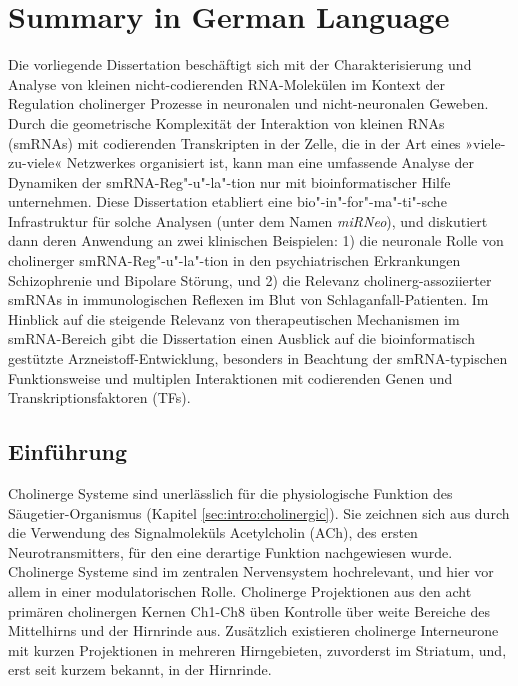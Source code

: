 \section{Summary in German Language}
Die vorliegende Dissertation beschäftigt sich mit der Charakterisierung und Analyse von kleinen nicht-codierenden RNA-Molekülen im Kontext der Regulation cholinerger Prozesse in neuronalen und nicht-neuronalen Geweben. Durch die geometrische Komplexität der Interaktion von kleinen RNAs (smRNAs) mit codierenden Transkripten in der Zelle, die in der Art eines »viele-zu-viele« Netzwerkes organisiert ist, kann man eine umfassende Analyse der Dynamiken der smRNA-Reg"-u"-la"-tion nur mit bioinformatischer Hilfe unternehmen. Diese Dissertation etabliert eine bio"-in"-for"-ma"-ti"-sche Infrastruktur für solche Analysen (unter dem Namen \emph{miRNeo}), und diskutiert dann deren Anwendung an zwei klinischen Beispielen: 1) die neuronale Rolle von cholinerger smRNA-Reg"-u"-la"-tion in den psychiatrischen Erkrankungen Schizophrenie und Bipolare Störung,\cite{Lobentanzer2019a} und 2) die Relevanz cholinerg-assoziierter smRNAs in immunologischen Reflexen im Blut von Schlaganfall-Patienten.\cite{Winek2020} Im Hinblick auf die steigende Relevanz von therapeutischen Mechanismen im smRNA-Bereich gibt die Dissertation einen Ausblick auf die bioinformatisch gestützte Arzneistoff-Entwicklung, besonders in Beachtung der smRNA-typischen Funktionsweise und multiplen Interaktionen mit codierenden Genen und Transkriptionsfaktoren (TFs).

\subsection{Einführung}
Cholinerge Systeme sind unerlässlich für die physiologische Funktion des Säugetier-Organismus (Kapitel \ref{sec:intro:cholinergic}). Sie zeichnen sich aus durch die Verwendung des Signalmoleküls Acetylcholin (ACh), des ersten Neurotransmitters, für den eine derartige Funktion nachgewiesen wurde.\cite{Dale1914,Loewi1921,Dale1929} Cholinerge Systeme sind im zentralen Nervensystem hochrelevant, und hier vor allem in einer modulatorischen Rolle. Cholinerge Projektionen aus den acht primären cholinergen Kernen Ch1-Ch8 üben Kontrolle über weite Bereiche des Mittelhirns und der Hirnrinde aus.\cite{Mesulam1984} Zusätzlich existieren cholinerge Interneurone mit kurzen Projektionen in mehreren Hirngebieten, zuvorderst im Striatum, und, erst seit kurzem bekannt, in der Hirnrinde.

